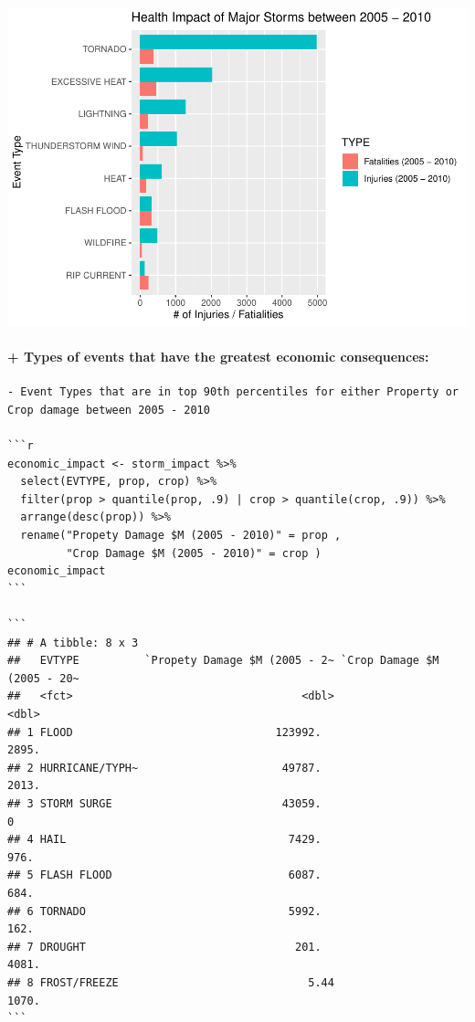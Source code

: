 \documentclass[]{article}
\let\oldparagraph\paragraph
\renewcommand{\paragraph}[1]{\oldparagraph{#1}\mbox{}}
\begin{document}
\includegraphics{NOAA_Storm_Analysis_files/figure-latex/unnamed-chunk-7-1.pdf}

\hypertarget{types-of-events-that-have-the-greatest-economic-consequences}{%
\paragraph{+ Types of events that have the greatest economic
consequences:}\label{types-of-events-that-have-the-greatest-economic-consequences}}

\begin{verbatim}
- Event Types that are in top 90th percentiles for either Property or Crop damage between 2005 - 2010

```r
economic_impact <- storm_impact %>%
  select(EVTYPE, prop, crop) %>%
  filter(prop > quantile(prop, .9) | crop > quantile(crop, .9)) %>%
  arrange(desc(prop)) %>%
  rename("Propety Damage $M (2005 - 2010)" = prop ,
         "Crop Damage $M (2005 - 2010)" = crop )
economic_impact
```

```
## # A tibble: 8 x 3
##   EVTYPE          `Propety Damage $M (2005 - 2~ `Crop Damage $M (2005 - 20~
##   <fct>                                   <dbl>                       <dbl>
## 1 FLOOD                               123992.                         2895.
## 2 HURRICANE/TYPH~                      49787.                         2013.
## 3 STORM SURGE                          43059.                            0 
## 4 HAIL                                  7429.                          976.
## 5 FLASH FLOOD                           6087.                          684.
## 6 TORNADO                               5992.                          162.
## 7 DROUGHT                                201.                         4081.
## 8 FROST/FREEZE                             5.44                       1070.
```
\end{verbatim}
\end{document}
